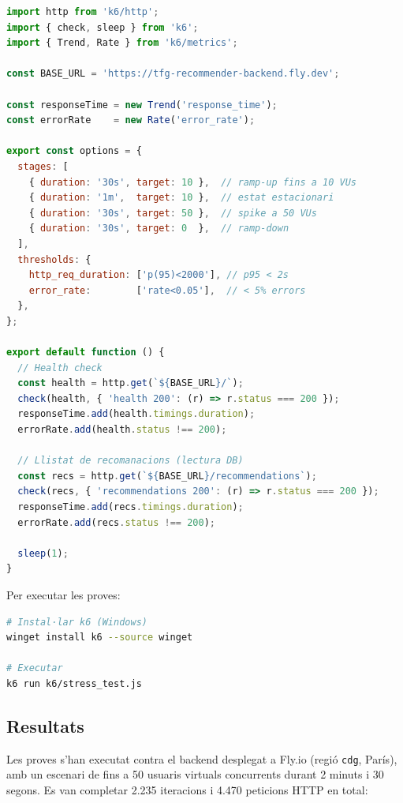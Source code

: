 \documentclass[12pt,a4paper]{article}
\begin{document}
\begin{lstlisting}[language=JavaScript, caption=Script de proves de càrrega (k6/stress\_test.js)]
import http from 'k6/http';
import { check, sleep } from 'k6';
import { Trend, Rate } from 'k6/metrics';

const BASE_URL = 'https://tfg-recommender-backend.fly.dev';

const responseTime = new Trend('response_time');
const errorRate    = new Rate('error_rate');

export const options = {
  stages: [
    { duration: '30s', target: 10 },  // ramp-up fins a 10 VUs
    { duration: '1m',  target: 10 },  // estat estacionari
    { duration: '30s', target: 50 },  // spike a 50 VUs
    { duration: '30s', target: 0  },  // ramp-down
  ],
  thresholds: {
    http_req_duration: ['p(95)<2000'], // p95 < 2s
    error_rate:        ['rate<0.05'],  // < 5% errors
  },
};

export default function () {
  // Health check
  const health = http.get(`${BASE_URL}/`);
  check(health, { 'health 200': (r) => r.status === 200 });
  responseTime.add(health.timings.duration);
  errorRate.add(health.status !== 200);

  // Llistat de recomanacions (lectura DB)
  const recs = http.get(`${BASE_URL}/recommendations`);
  check(recs, { 'recommendations 200': (r) => r.status === 200 });
  responseTime.add(recs.timings.duration);
  errorRate.add(recs.status !== 200);

  sleep(1);
}
\end{lstlisting}

Per executar les proves:

\begin{lstlisting}[language=bash]
# Instal·lar k6 (Windows)
winget install k6 --source winget

# Executar
k6 run k6/stress_test.js
\end{lstlisting}

\subsection{Resultats}

Les proves s'han executat contra el backend desplegat a Fly.io (regió \texttt{cdg}, París), amb un escenari de fins a 50 usuaris virtuals concurrents durant 2 minuts i 30 segons. Es van completar 2.235 iteracions i 4.470 peticions HTTP en total:
\end{document}
